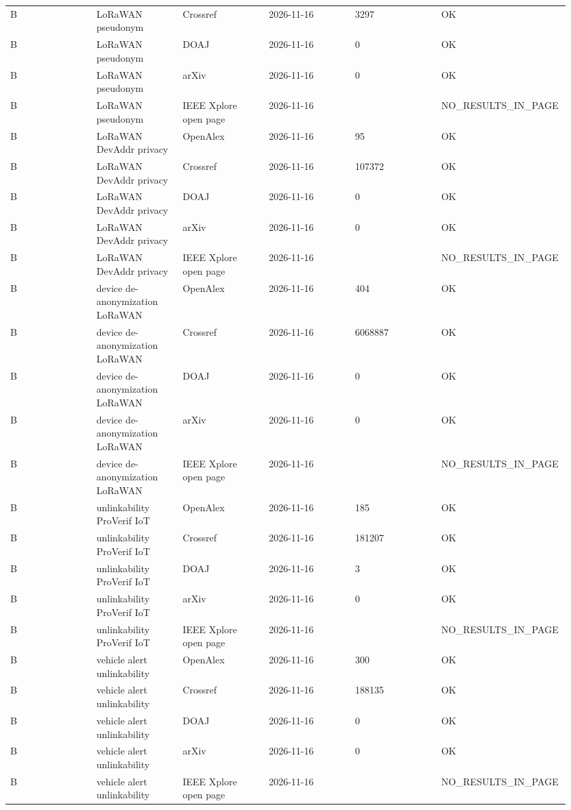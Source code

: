{\begin{longtable}{p{0.158\linewidth}p{0.158\linewidth}p{0.158\linewidth}p{0.158\linewidth}p{0.158\linewidth}p{0.158\linewidth}}
B & LoRaWAN pseudonym & Crossref & 2026-11-16 & 3297 & OK \\
B & LoRaWAN pseudonym & DOAJ & 2026-11-16 & 0 & OK \\
B & LoRaWAN pseudonym & arXiv & 2026-11-16 & 0 & OK \\
B & LoRaWAN pseudonym & IEEE Xplore open page & 2026-11-16 &  & NO\_RESULTS\_IN\_PAGE \\
B & LoRaWAN DevAddr privacy & OpenAlex & 2026-11-16 & 95 & OK \\
B & LoRaWAN DevAddr privacy & Crossref & 2026-11-16 & 107372 & OK \\
B & LoRaWAN DevAddr privacy & DOAJ & 2026-11-16 & 0 & OK \\
B & LoRaWAN DevAddr privacy & arXiv & 2026-11-16 & 0 & OK \\
B & LoRaWAN DevAddr privacy & IEEE Xplore open page & 2026-11-16 &  & NO\_RESULTS\_IN\_PAGE \\
B & device de-anonymization LoRaWAN & OpenAlex & 2026-11-16 & 404 & OK \\
B & device de-anonymization LoRaWAN & Crossref & 2026-11-16 & 6068887 & OK \\
B & device de-anonymization LoRaWAN & DOAJ & 2026-11-16 & 0 & OK \\
B & device de-anonymization LoRaWAN & arXiv & 2026-11-16 & 0 & OK \\
B & device de-anonymization LoRaWAN & IEEE Xplore open page & 2026-11-16 &  & NO\_RESULTS\_IN\_PAGE \\
B & unlinkability ProVerif IoT & OpenAlex & 2026-11-16 & 185 & OK \\
B & unlinkability ProVerif IoT & Crossref & 2026-11-16 & 181207 & OK \\
B & unlinkability ProVerif IoT & DOAJ & 2026-11-16 & 3 & OK \\
B & unlinkability ProVerif IoT & arXiv & 2026-11-16 & 0 & OK \\
B & unlinkability ProVerif IoT & IEEE Xplore open page & 2026-11-16 &  & NO\_RESULTS\_IN\_PAGE \\
B & vehicle alert unlinkability & OpenAlex & 2026-11-16 & 300 & OK \\
B & vehicle alert unlinkability & Crossref & 2026-11-16 & 188135 & OK \\
B & vehicle alert unlinkability & DOAJ & 2026-11-16 & 0 & OK \\
B & vehicle alert unlinkability & arXiv & 2026-11-16 & 0 & OK \\
B & vehicle alert unlinkability & IEEE Xplore open page & 2026-11-16 &  & NO\_RESULTS\_IN\_PAGE \\

\end{longtable}}
